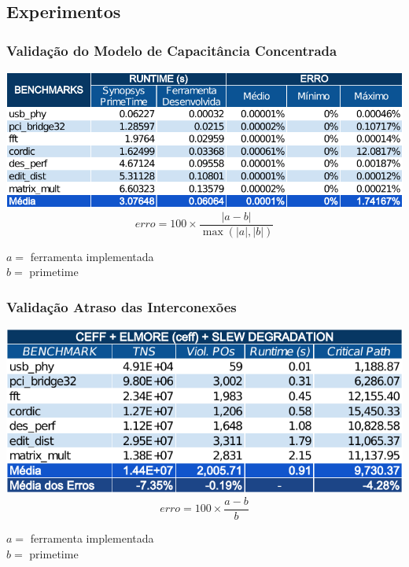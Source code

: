 \documentclass[10pt,a4paper]{beamer}
\begin{document}
		\subsection*{Experimentos}
		\begin{frame}[t]
			\frametitle{Validação do Modelo de Capacitância Concentrada}
			\begin{center}
				\includegraphics[width=\linewidth]{img/lumped_capacitance_vs_primetime.pdf} 
				$$erro = 100 \times \frac{|a - b|}{\max(|a|, |b|)} $$
			\end{center}

			$a = $ ferramenta implementada \\
			$b = $ primetime
			
			
		\end{frame}
		
		\begin{frame}[t]
			\frametitle{Validação Atraso das Interconexões}
			\begin{center}
				\includegraphics[width=\linewidth]{img/ceff_elmore_slew.pdf}
				$$erro = 100 \times \frac{a - b}{ b } $$
			\end{center}
			
			$a = $ ferramenta implementada \\
			$b = $ primetime
			
		\end{frame}
		
\end{document}

